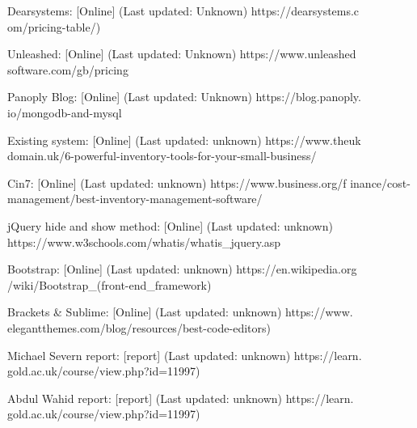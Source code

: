 \begin{thebibliography}{9}

Dearsystems: [Online] (Last updated: Unknown) https://dearsystems.c om/pricing-table/)

Unleashed: [Online] (Last updated: Unknown) https://www.unleashed software.com/gb/pricing

Panoply Blog: [Online] (Last updated: Unknown) https://blog.panoply. io/mongodb-and-mysql

Existing system: [Online] (Last updated: unknown) https://www.theuk domain.uk/6-powerful-inventory-tools-for-your-small-business/

Cin7: [Online] (Last updated: unknown) https://www.business.org/f inance/cost-management/best-inventory-management-software/

jQuery hide and show method: [Online] (Last updated: unknown) https://www.w3schools.com/whatis/whatis\_jquery.asp

Bootstrap: [Online] (Last updated: unknown) https://en.wikipedia.org /wiki/Bootstrap\_(front-end\_framework)

Brackets \& Sublime: [Online] (Last updated: unknown) https://www. elegantthemes.com/blog/resources/best-code-editors)

Michael Severn report: [report] (Last updated: unknown) https://learn. gold.ac.uk/course/view.php?id=11997)

Abdul Wahid report: [report] (Last updated: unknown) https://learn. gold.ac.uk/course/view.php?id=11997)

\end{thebibliography}